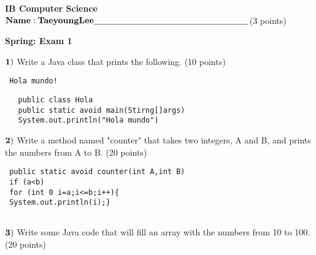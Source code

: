 \documentclass{article}
\begin{document}

\doublespacing
\textbf{IB Computer Science }                        %
 \hfill                             %
$ {\bf Name:Taeyoung Lee } \underline{\hspace{2.5in}}$(3 points)

\begin{centering}
\vspace{1cm}
\textbf{Spring: Exam 1}\\
\end{centering}
\vspace{1cm}
 

  
 
 $\bf{1)}$ Write a Java class that prints the following. (10 points)
  
   \begin{verbatim}
 Hola mundo!
 \end{verbatim}


   \begin{verbatim}
   public class Hola 
   public static avoid main(Stirng[]args)
   System.out.println("Hola mundo")
   \end{verbatim}
 
 $\bf{2)}$ Write a method named "counter" that takes two integers, A and B, and prints the numbers from A to B. (20 points)
  \vspace{0.5cm}


 \begin{verbatim}
 public static avoid counter(int A,int B)
 if (a<b) 
 for (int 0 i=a;i<=b;i++){
 System.out.println(i);}
 
 \end{verbatim}
 
  $\bf{3)}$ Write some Java code that will fill an array with the numbers from 10 to 100.  (20 points)
   \vspace{0.5cm}

\end{document}
